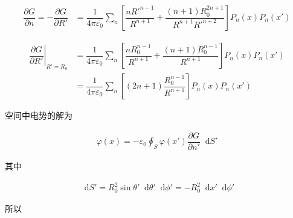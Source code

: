 \documentclass{article}
\newcommand*{\md}{\mathop{}\!\mathrm{d}}
\begin{document}
\begin{equation*}
  \begin{aligned}
    \dfrac{\partial G}{\partial n} = - 
    \dfrac{\partial G}{\partial R'} &=
    \dfrac{1}{4\pi \varepsilon_0} \sum_n \left[ \dfrac{n R'^{n-1}}{R^{n+1}}  + \dfrac{\left( n+1 \right) R_0^{2n+1}}{R^{n+1} R'^{n+2}}  \right] P_n \left( x \right) P_n \left( x' \right)
  \end{aligned}
\end{equation*}

\begin{equation*}
  \begin{aligned}
    \left. \dfrac{\partial G}{\partial R'} \right|_{R'=R_0} &=
    \dfrac{1}{4\pi \varepsilon_0} \sum_n \left[ \dfrac{n R_0^{n-1}}{R^{n+1}} + \dfrac{ \left( n+1 \right) R_0^{n-1}}{R^{n+1}} \right] P_n \left( x \right) P_n \left( x' \right) \\
    &= \dfrac{1}{4\pi \varepsilon_0} \sum_n \left[ \left( 2n+1 \right) \dfrac{R_0^{n-1} }{R^{n+1}} \right] P_n \left( x \right) P_n \left( x' \right)
  \end{aligned}
\end{equation*}

空间中电势的解为

\begin{equation*}
  \begin{aligned}
    \varphi \left( x \right) = - \varepsilon_0 \oint_S \varphi \left( x' \right) \dfrac{\partial G}{\partial n'}  \md S'
  \end{aligned}
\end{equation*}

其中

\begin{equation*}
  \begin{aligned}
    \md S' = R_0^2 \sin \theta' \md \theta' \md \phi' = - R_0^2 \md x' \md \phi'
  \end{aligned}
\end{equation*}

所以
\end{document}
